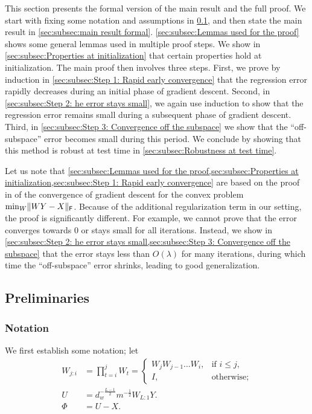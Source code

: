 This section presents the formal version of the main result and the full proof. 
We start with fixing some notation and assumptions in \cref{sec:subsec:prelim}, and then state the main result in \cref{sec:subsec:main result formal}.
\cref{sec:subsec:Lemmas used for the proof} shows some general lemmas used in multiple proof steps. 
We show in \cref{sec:subsec:Properties at initialization} that certain properties hold at initialization.
The main proof then involves three steps.
First, we prove by induction in \cref{sec:subsec:Step 1: Rapid early convergence} that the regression error rapidly decreases during an initial phase of gradient descent.
Second, in \cref{sec:subsec:Step 2: he error stays small}, we again use induction to show that the regression error remains small during a subsequent phase of gradient descent.
Third, in \cref{sec:subsec:Step 3: Convergence off the subspace} we show that the ``off-subspace'' error becomes small during this period. 
We conclude by showing that this method is robust at test time in \cref{sec:subsec:Robustness at test time}.

Let us note that \cref{sec:subsec:Lemmas used for the proof,sec:subsec:Properties at initialization,sec:subsec:Step 1: Rapid early convergence} are based on the proof in \cite{du2019width} of the convergence of gradient descent for the convex problem $\min_W \lVert WY-X\rVert_{\mathsf{F}}$. Because of the additional regularization term in our setting, the proof is significantly different. For example, we cannot prove that the error converges towards $0$ or stays small for all iterations. Instead, we show in \cref{sec:subsec:Step 2: he error stays small,sec:subsec:Step 3: Convergence off the subspace} that the error stays less than $O(\lambda)$ for many iterations, during which time the ``off-subspace'' error shrinks, leading to good generalization.
\subsection{Preliminaries}
\label{sec:subsec:prelim}

\subsubsection{Notation}
\label{sec:subsec:subsubsec:notation}
We first establish some notation; let
\begin{subequations}
	\begin{align}
		W_{j:i} & = \prod_{t=i}^j W_{t} = \begin{cases}
			                                  W_j W_{j-1} \ldots W_i, & \text{if $i \leq j$}, \\
			                                  I,                      & \text{otherwise};
		                                  \end{cases} \\
		U       & = d_w^{-\frac{L-1}{2}}m^{-\frac{1}{2}} W_{L:1}Y.                        \\
		\Phi    & = U - X.
	\end{align}
\end{subequations}

